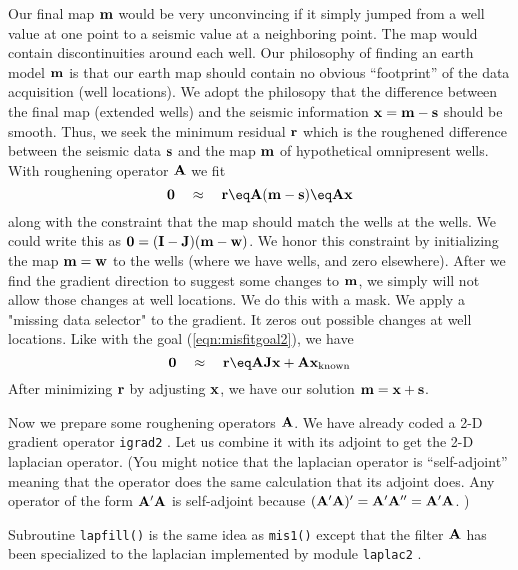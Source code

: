 \par
Our final map $\bold m$ would be very unconvincing if
it simply jumped from a well value at one point
to a seismic value at a neighboring point.
The map would contain discontinuities around each well.
Our philosophy of finding an earth model $\bold m$
is that our earth map should contain no obvious 
``footprint'' of the data acquisition (well locations).
We adopt the philosopy that the difference
between the final map (extended wells)
and the seismic information $\bold x=\bold m-\bold s$ should be smooth.
Thus,
we seek the minimum residual $\bold r$
which is the roughened difference between the seismic data $\bold s$
and the map $\bold m$ of hypothetical omnipresent wells.
With roughening operator $\bold A$ we fit
\begin{equation}
\bold 0\quad\approx\quad \bold r \eq \bold A ( \bold m - \bold s )
	\eq \bold A \bold x
\label{eqn:unconmap}
\end{equation}
along with the constraint
that the map should match the wells at the wells.
We could write this as
$\bold 0 = (\bold I-\bold J) ( \bold m - \bold w )$.
We honor this constraint by initializing the map $\bold m = \bold w$
to the wells (where we have wells, and zero elsewhere).
After we find the gradient direction to suggest some changes
to $\bold m$, we simply will not allow those changes at well locations.
We do this with a mask.
We apply a "missing data selector" to the gradient.
It zeros out possible changes at well locations.
Like with the goal (\ref{eqn:misfitgoal2}),
we have
\begin{equation}
\bold 0\quad\approx\quad \bold r \eq
\bold A \bold J \bold x + \bold A \bold x_{\rm known}
\end{equation}
After minimizing $\bold r$ by adjusting $\bold x$,
we have our solution $ \bold m =  \bold x + \bold s $.

\par
Now we prepare some roughening operators $\bold A$.
We have already coded a 2-D gradient operator
\texttt{igrad2} .
Let us combine it with its adjoint to get the 2-D laplacian operator.
(You might notice that the laplacian operator is ``self-adjoint'' meaning
that the operator does the same calculation that its adjoint does.
Any operator of the form $\bold A'\bold A$ is self-adjoint because
$(\bold A'\bold A)'=\bold A'\bold A''=\bold A'\bold A$. )
\par
{} 
Subroutine \texttt{lapfill()}
 is the same idea as \texttt{mis1()}
 except that 
the filter $\bold A$ has been specialized to the 
laplacian
implemented by module \texttt{laplac2} . 



